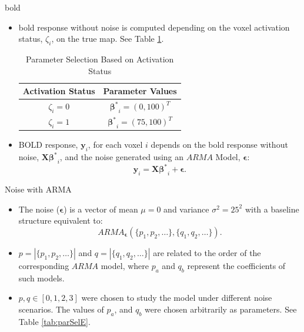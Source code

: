 \documentclass{beamer}
\begin{document}
\begin{frame}{\acrshort{bold}}
\begin{itemize}
\item \gls{bold} response without noise is computed depending on the voxel 
activation status, $\zeta_i$, on the true map. See Table \ref{tab:parSelA}.

\begin{table}
\centering
\caption{Parameter Selection Based on Activation Status}
\begin{tabular}{cc}
\hline
\textbf{Activation Status} & \textbf{Parameter Values} \\ \hline
$\zeta_i=0$ & $\bm{\beta^*}_i = (0,100)^T$ \\
$\zeta_i=1$ & $\bm{\beta^*}_i = (75,100)^T$ \\ \hline
\end{tabular}
\label{tab:parSelA}
\end{table}

\item BOLD response, $\bm{y}_i$, for each voxel $i$ depends on the \gls{bold} 
response without noise, $\bm{X}\bm{\beta^*}_i$, and the noise generated 
using an $ARMA$ Model, $\bm{\epsilon}$:
$$
\bm{y}_i = \bm{X}\bm{\beta^*}_i + \bm{\epsilon}.
$$
\end{itemize}
\end{frame}


\begin{frame}{Noise with ARMA}
\begin{itemize}
\item The noise ($\bm{\epsilon}$) is a vector of mean $\mu = 0$ and variance 
$\sigma^2=25^2$ with a baseline structure equivalent to: 
$$ARMA_{\bm{\epsilon}}\left( \{p_1,p_2,\dots\},\{q_1,q_2,\dots\} \right).$$

\item $p = \left| \{p_1,p_2,\dots\} \right|$ and $q= \left| \{q_1,q_2,\dots\} \right|$ are 
related to the order of the corresponding $ARMA$ model, where $p_a$ and $q_b$ represent the 
coefficients of such models.

\item $p,q \in [0,1,2,3]$ were chosen to study the model under 
different noise scenarios. The values of $p_a$, and $q_b$ were chosen arbitrarily 
as parameters. See Table \ref{tab:parSelE}.

\end{itemize}
\end{frame}
\end{document}
